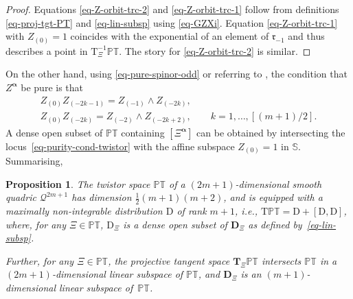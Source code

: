 \documentclass[pdftex]{sigma}
\numberwithin{equation}{section}
\newtheorem{Proposition}[Theorem]{Proposition}
 { \theoremstyle{definition}
\newtheorem{Definition}[Theorem]{Definition}
\newtheorem{Example}[Theorem]{Example}
\newtheorem{Remark}[Theorem]{Remark} }
\newcommand{\mbf} [1]{\mathbf{#1}}
\newcommand{\mc} [1]{\mathcal{#1}}
\newcommand{\Tgt} {\mathrm{T}}
\newcommand{\mfr} {\mathfrak{r}}
\newcommand{\PT} {\mathbb{PT}}
\newcommand{\Ss} {\mathbb{S}}
\begin{document}
\begin{proof}
Equations \eqref{eq-Z-orbit-trc-2} and \eqref{eq-Z-orbit-trc-1} follow from def\/initions \eqref{eq-proj-tgt-PT} and \eqref{eq-lin-subsp} using \eqref{eq-GZXi}. Equation \eqref{eq-Z-orbit-trc-1} with $Z_{(0)} =1$ coincides with the exponential of an element of $\mfr_{-1}$ and thus describes a point in $\Tgt^{-1}_\Xi \PT$. The story for \eqref{eq-Z-orbit-trc-2} is similar.
\end{proof}

On the other hand, using \eqref{eq-pure-spinor-odd} or referring to \cite{Cartan1981}, the condition that $Z^{\bm{\upalpha}}$ be pure is that
\begin{gather}
Z_{(0)} Z_{(-2k-1)} = Z_{(-1)} \wedge Z_{(-2k)} , \nonumber\\
Z_{(0)} Z_{(-2k)} = Z_{(-2)} \wedge Z_{(-2k+2)} ,\qquad k=1, \ldots , [(m+1)/2] .\label{eq-purity-cond-twistor}
\end{gather}
A dense open subset of $\PT$ containing $[\Xi^{\bm{\upalpha}}]$ can be obtained by intersecting the locus~\eqref{eq-purity-cond-twistor} with the af\/f\/ine subspace $Z_{(0)} =1$ in $\Ss$. Summarising,

\begin{Proposition}\label{prop-canonical-distribution}
The twistor space $\PT$ of a $(2m+1)$-dimensional smooth quadric $\mc{Q}^{2m+1}$ has dimension $\frac{1}{2}(m+1)(m+2)$, and is equipped with a maximally non-integrable distribution $\mathrm{D}$ of rank $m+1$, i.e., $\Tgt \PT = \mathrm{D} + [ \mathrm{D} , \mathrm{D} ]$, where, for any $\Xi \in \PT$, $\mathrm{D}_\Xi$ is a dense open subset of $\mbf{D}_\Xi$ as defined by~\eqref{eq-lin-subsp}.

Further, for any $\Xi \in \PT$, the projective tangent space $\mbf{T}_\Xi \PT$ intersects $\PT$ in a $(2m+1)$-dimensional linear subspace of $\PT$, and $\mbf{D}_\Xi$ is an $(m+1)$-dimensional linear subspace of~$\PT$.
\end{Proposition}
\end{document}
